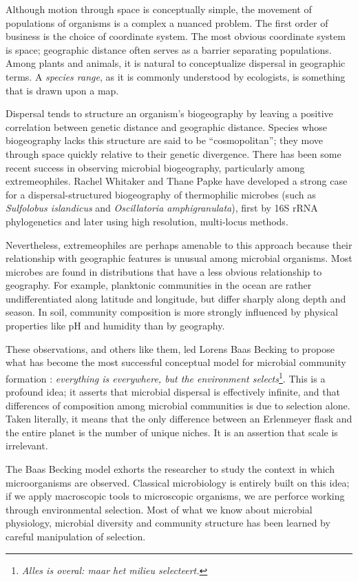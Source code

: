 Although motion through space is conceptually simple, the movement of populations of organisms is a complex a nuanced problem. The first order of business is the choice of coordinate system. The most obvious coordinate system is space; geographic distance often serves as a barrier separating populations. Among plants and animals, it is natural to conceptualize dispersal in geographic terms. A {\em species range}, as it is commonly understood by ecologists, is something that is drawn upon a map. 



Dispersal tends to structure an organism's biogeography by leaving a positive correlation between genetic distance and geographic distance. Species whose biogeography lacks this structure are said to be ``cosmopolitan''; they move through space quickly relative to their genetic divergence. There has been some recent success in observing microbial biogeography, particularly among extremeophiles. Rachel Whitaker and Thane Papke have developed a strong case for a dispersal-structured biogeography of thermophilic microbes (such as {\em Sulfolobus islandicus} and {\em Oscillatoria amphigranulata}), first by 16S rRNA phylogenetics and later using high resolution, multi-locus methods.

Nevertheless, extremeophiles are perhaps amenable to this approach because their relationship with geographic features is unusual among microbial organisms. Most microbes are found in distributions that have a less obvious relationship to geography. For example, planktonic communities in the ocean are rather undifferentiated along latitude and longitude, but differ sharply along depth and season. In soil, community composition is more strongly influenced by physical properties like pH and humidity than by geography. 

These observations, and others like them, led Lorens Baas Becking to propose what has become the most successful conceptual model for microbial community formation : {\em everything is everywhere, but the environment selects}\footnote{{\em Alles is overal: maar het milieu selecteert.}}. This is a profound idea; it asserts that microbial dispersal is effectively infinite, and that differences of composition among microbial communities is due to selection alone. Taken literally, it means that the only difference between an Erlenmeyer flask and the entire planet is the number of unique niches. It is an assertion that scale is irrelevant.

The Baas Becking model exhorts the researcher to study the context in which microorganisms are observed. Classical microbiology is entirely built on this idea; if we apply macroscopic tools to microscopic organisms, we are perforce working through environmental selection. Most of what we know about microbial physiology, microbial diversity and community structure has been learned by careful manipulation of selection.

